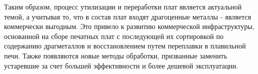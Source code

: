 Таким образом, процесс утилизации и переработки плат является актуальной темой, а учитывая то, что в состав плат входят драгоценные металлы - является коммерчески выгодным. Это привело к развитию коммерческой инфраструктуры, основанной на сборе печатных плат с последующей их сортировкой по содержанию драгметаллов и восстановлением путем переплавки в плавильной печи. Также появляются новые методы обработки, призванные заменить устаревшие за счет большей эффективности и более дешевой эксплуатации.